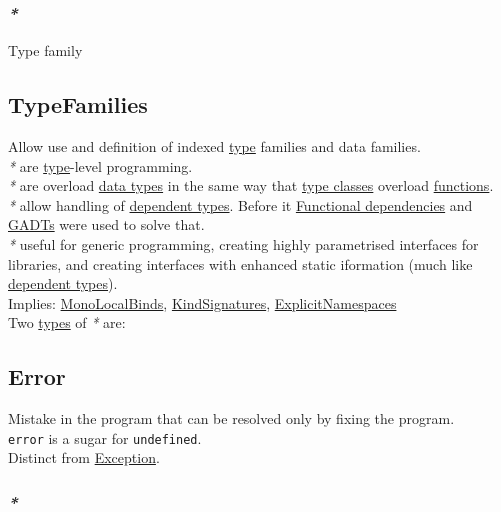 \documentclass[11pt]{article}
\begin{document}
\subsubsection{\emph{*}}
\label{sec:org2e78d1a}

\label{org7104d91}Type family\\

\subsection{\label{org381688d}TypeFamilies}
\label{sec:orga7f7d19}
Allow use and definition of indexed \hyperref[org4fbaeb8]{type} families and data families.\\

\emph{*} are \hyperref[org4fbaeb8]{type}-level programming.\\
\emph{*} are overload \hyperref[org88981ee]{data types} in the same way that \hyperref[org2efac60]{type classes} overload \hyperref[org66c5288]{functions}.\\
\emph{*} allow handling of \hyperref[orgae20a26]{dependent types}. Before it \hyperref[org62d1f62]{Functional dependencies} and \hyperref[org04473bc]{GADTs} were used to solve that.\\
\emph{*} useful for generic programming, creating highly parametrised interfaces for libraries, and creating interfaces with enhanced static iformation (much like \hyperref[orgae20a26]{dependent types}).\\

Implies: \hyperref[org22b0332]{MonoLocalBinds}, \hyperref[orgd5834af]{KindSignatures}, \hyperref[orgd6a7800]{ExplicitNamespaces}\\

Two \hyperref[org3927fd9]{types} of \emph{*} are:\\

\subsection{\label{orgb69b647}Error}
\label{sec:org10e7900}
Mistake in the program that can be resolved only by fixing the program.\\

\texttt{error} is a sugar for \texttt{undefined}.\\

Distinct from \hyperref[org15cd20b]{Exception}.\\

\subsubsection{\emph{*}}
\label{sec:orgf95b571}
\end{document}
